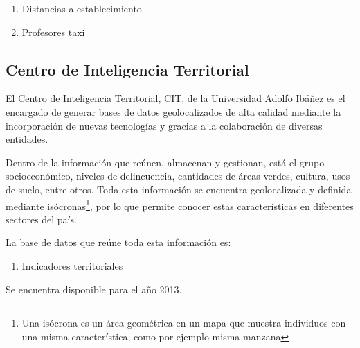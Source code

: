 \begin{enumerate}
\item Distancias a establecimiento
\item Profesores taxi
\end{enumerate}

\subsection{Centro de Inteligencia Territorial}
El Centro de Inteligencia Territorial, CIT, de la Universidad Adolfo Ibáñez es el encargado de generar bases de datos geolocalizados de alta calidad mediante la incorporación de nuevas tecnologías y gracias a la colaboración de diversas entidades. 

Dentro de la información que reúnen, almacenan y gestionan, está el grupo socioeconómico, niveles de delincuencia, cantidades de áreas verdes, cultura, usos de suelo, entre otros. Toda esta información se encuentra geolocalizada y definida mediante isócronas\footnote{Una isócrona es un área geométrica en un mapa que muestra individuos con una misma característica, como por ejemplo misma manzana}, por lo que permite conocer estas características en diferentes sectores del país.

La base de datos que reúne toda esta información es:
\begin{enumerate}
\item Indicadores territoriales
\end{enumerate}

Se encuentra disponible para el año 2013. 

